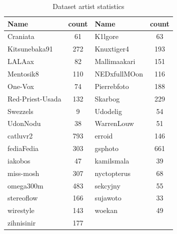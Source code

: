 \begin{table}[htb]
    \centering
    \begin{tabular}
        { | l | c | l | c|} 
        \hline
        Name & count & Name & count \\
        \hline
    Craniata &  61 & K1lgore & 63 \\
    Kitsunebaka91 & 272  & Knuxtiger4 & 193 \\
    LALAax & 82  & Mallimaakari & 151 \\
    Mentosik8 & 110 & NEDxfullMOon & 116 \\
    One-Vox & 74 & Pierrebfoto & 188 \\
    Red-Priest-Usada & 132 & Skarbog & 229 \\
    Swezzels & 9 & Udodelig & 54 \\
    UdonNodu & 38 & WarrenLouw & 51 \\
    catluvr2 & 793 & erroid & 146 \\
    fediaFedia & 303 & gsphoto & 661 \\
    iakobos & 47 & kamilsmala & 39 \\
    miss-mosh & 307 & nyctopterus & 68 \\
    omega300m & 483 & sekcyjny & 55 \\
    stereoflow & 166 & sujawoto & 33 \\
    wirestyle & 143 & woekan & 49 \\
    zihnisinir & 177 \\

        \hline 
    \end{tabular}
    \caption{Dataset artist statistics}
    \label{datasetstats2}
\end{table}

